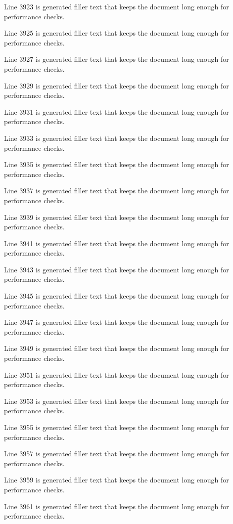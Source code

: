 Line 3923 is generated filler text that keeps the document long enough for performance checks.

Line 3925 is generated filler text that keeps the document long enough for performance checks.

Line 3927 is generated filler text that keeps the document long enough for performance checks.

Line 3929 is generated filler text that keeps the document long enough for performance checks.

Line 3931 is generated filler text that keeps the document long enough for performance checks.

Line 3933 is generated filler text that keeps the document long enough for performance checks.

Line 3935 is generated filler text that keeps the document long enough for performance checks.

Line 3937 is generated filler text that keeps the document long enough for performance checks.

Line 3939 is generated filler text that keeps the document long enough for performance checks.

Line 3941 is generated filler text that keeps the document long enough for performance checks.

Line 3943 is generated filler text that keeps the document long enough for performance checks.

Line 3945 is generated filler text that keeps the document long enough for performance checks.

Line 3947 is generated filler text that keeps the document long enough for performance checks.

Line 3949 is generated filler text that keeps the document long enough for performance checks.

Line 3951 is generated filler text that keeps the document long enough for performance checks.

Line 3953 is generated filler text that keeps the document long enough for performance checks.

Line 3955 is generated filler text that keeps the document long enough for performance checks.

Line 3957 is generated filler text that keeps the document long enough for performance checks.

Line 3959 is generated filler text that keeps the document long enough for performance checks.

Line 3961 is generated filler text that keeps the document long enough for performance checks.

